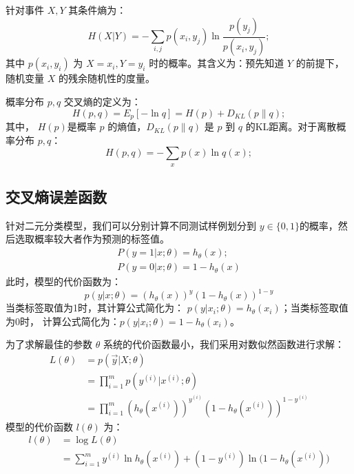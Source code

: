 \documentclass[oneside]{ZJUthesis}
\begin{document}
针对事件 $X,Y$ 其条件熵为：
\begin{equation}
	H(X|Y)=-\sum\limits_{i,j}{p(x_i,y_j)\ln \frac{p(y_j)}{p(x_i,y_j)}};
\end{equation}
其中 $p(x_i,y_i)$ 为 $X=x_i,Y=y_i$ 时的概率。其含义为：预先知道 $Y$ 的前提下，随机变量 $X$ 的残余随机性的度量。

概率分布 $p,q$ 交叉熵的定义为：
\begin{equation}
	H(p,q)=E_p [-\ln q]= H(p)+D_{KL}(p\|q);
\end{equation}
其中， $H(p)$是概率 $p$ 的熵值，$D_{KL}(p\|q)$ 是 $p$ 到 $q$ 的KL距离。对于离散概率分布 $p,q$：
\begin{equation}
	H(p,q)=-\sum\limits_{x}{p(x)\ln q(x)};
\end{equation}



\subsection{交叉熵误差函数}
针对二元分类模型，我们可以分别计算不同测试样例划分到 $y \in \{0,1\}$的概率，然后选取概率较大者作为预测的标签值。
\begin{equation}\begin{array}{l}
	P(y=1|x;\theta)=h_{\theta}(x);\\
	P(y=0|x;\theta)=1-h_{\theta}(x)
\end{array}\end{equation}
此时，模型的代价函数为：
\begin{equation}
p(y|x;\theta) = (h_{\theta}(x))^y(1-h_{\theta}(x))^{1-y}
\end{equation}
当类标签取值为1时，其计算公式简化为： $p(y|x_i;\theta)=h_{\theta}(x_i)$；当类标签取值为0时， 计算公式简化为：$p(y|x_i;\theta)=1- h_{\theta}(x_i)$。

为了求解最佳的参数 $\theta$ 系统的代价函数最小，我们采用对数似然函数进行求解：
\begin{equation}\begin{aligned}
	L(\theta)&=p(\overrightarrow {y}|X;\theta)\\
		 &=\prod\limits_{i = 1}^m {p(y^{(i)}|x^{(i)};\theta)} \\
		 &=\prod\limits_{i = 1}^m {(h_{\theta}(x^{(i)}))^{y^{(i)}}(1-h_{\theta}(x^{(i)}))^{1-y^{(i)}}}
\end{aligned}\end{equation}
模型的代价函数 $l(\theta)$ 为：
\begin{equation}\begin{aligned}
	l(\theta)&=\log L(\theta) \\
		&=\sum\limits_{i = 1}^m {y^{(i)} \ln h_{\theta}(x^{(i)})+(1-y^{(i)}) \ln (1-h_{\theta}(x^{(i)})})
\end{aligned}\end{equation}
\end{document}
